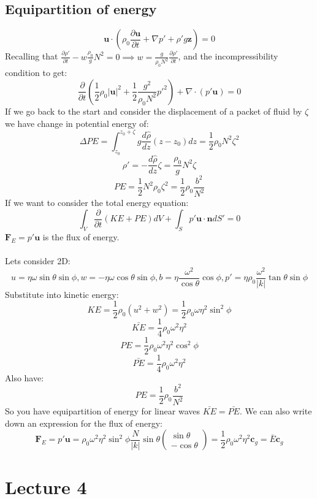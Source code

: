 \documentclass{article}
\begin{document}
\subsection{Equipartition of energy}
$$
\bm u \cdot (\rho_0 \frac{\partial \bm u}{\partial t} + \nabla p' + \rho' g \bm z) = 0
$$
Recalling that $\frac{\partial \rho'}{\partial t} - w \frac{\rho_0}{g} N^2 = 0 \implies w = \frac{g}{\rho_0 N^2} \frac{\partial \rho'}{\partial t}$, and the incompressibility condition to get:
$$
\frac{\partial}{\partial t}( \frac{1}{2} \rho_0 |\bm u |^2 + \frac{1}{2} \frac{g^2}{\rho_0 N^2} p'^2 ) + \nabla \cdot (p' \bm u) = 0
$$
If we go back to the start and consider the displacement of a packet of fluid by $\zeta$ we have change in potential energy of:
$$
\Delta PE = \int^{z_0 + \zeta}_{z_0} g \frac{d \hat \rho}{d z} (z - z_0) dz = \frac{1}{2} \rho_0 N^2 \zeta^2
$$
$$
\rho' = - \frac{d \hat \rho}{dz} \zeta = \frac{\rho_0}{g} N^2 \zeta 
$$
$$
PE = \frac{1}{2} N^2 \rho_0 \zeta^2 = \frac{1}{2} \rho_0 \frac{b^2}{N^2}
$$
If we want to consider the total energy equation:
$$
\int_V \frac{\partial}{\partial t} (KE + PE) dV + \int_S p' \bm u \cdot \bm n dS' = 0
$$
$\bm F_E = p'\bm u$ is the flux of energy.\\\\
Lets consider 2D:
$$
u = \eta \omega \sin \theta \sin \phi, w = - \eta \omega \cos \theta \sin \phi, b = \eta \frac{\omega^2}{\cos \theta} \cos \phi, p' = \eta \rho_0 \frac{\omega^2}{|k|} \tan \theta \sin \phi
$$
Substitute into kinetic energy:
$$
KE = \frac{1}{2} \rho_0 (u^2 + w^2) = \frac{1}{2} \rho_0 \omega \eta^2 \sin^2 \phi
$$
$$
\bar{KE} = \frac{1}{4} \rho_0 \omega^2 \eta^2
$$
$$
PE = \frac{1}{2} \rho_0 \omega^2 \eta^2 \cos^2\phi
$$
$$
\bar{PE} = \frac{1}{4} \rho_0 \omega^2 \eta^2
$$
Also have:
$$
PE = \frac{1}{2} \rho_0 \frac{b^2}{N^2}
$$
So you have equipartition of energy for linear waves $\bar{KE} = \bar{PE}$. We can also write down an expression for the flux of energy:
$$
\bm F_E = p' \bm u = \rho_0 \omega^2 \eta^2 \sin^2 \phi  \frac{N}{|k|} \sin \theta \begin{pmatrix} \sin \theta\\ - \cos \theta \end{pmatrix} = \frac{1}{2} \rho_0 \omega^2 \eta^2 \bm c_g = \bar{E} \bm c_g
$$
\section{Lecture 4}
\end{document}
